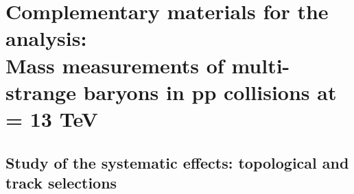 \chapter{Complementary materials for the analysis:\\Mass measurements of multi-strange baryons in pp collisions at \sqrtS = 13 TeV}
\label{appendix:CPTAnalysis}

\newpage

\section{Study of the systematic effects: topological and track selections}


